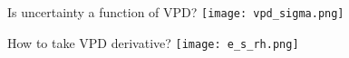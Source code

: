 \documentclass[aspectratio=169]{beamer}
\begin{document}
\begin{frame}{Is uncertainty a function of VPD?}
  \texttt{[image: vpd\_sigma.png]}
\end{frame}

\begin{frame}{How to take VPD derivative?}
  \texttt{[image: e\_s\_rh.png]}
\end{frame}



\end{document}
